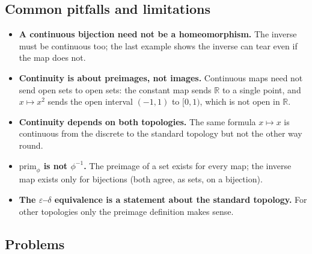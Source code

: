\documentclass[11pt]{article}
\newcommand{\prim}[1]{\mathrm{prim}_{#1}}
\begin{document}
\subsection*{Common pitfalls and limitations}

\begin{itemize}
  \item \textbf{A continuous bijection need not be a homeomorphism.} The inverse must be continuous too; the last example shows the inverse can tear even if the map does not.
  \item \textbf{Continuity is about preimages, not images.} Continuous maps need not send open sets to open sets: the constant map sends $\mathbb R$ to a single point, and $x\mapsto x^2$ sends the open interval $(-1,1)$ to $[0,1)$, which is not open in $\mathbb R$.
  \item \textbf{Continuity depends on both topologies.} The same formula $x\mapsto x$ is continuous from the discrete to the standard topology but not the other way round.
  \item \textbf{$\prim{\phi}$ is not $\phi^{-1}$.} The preimage of a set exists for every map; the inverse map exists only for bijections (both agree, as sets, on a bijection).
  \item \textbf{The $\varepsilon$--$\delta$ equivalence is a statement about the standard topology.} For other topologies only the preimage definition makes sense.
\end{itemize}

\subsection*{Problems}
\end{document}

